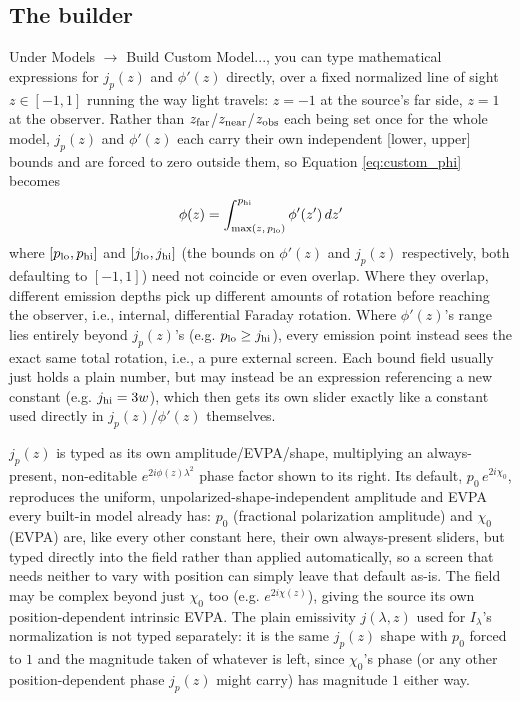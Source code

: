 \subsection{The builder}
Under Models $\to$ Build Custom Model..., you can type mathematical expressions for $j_p(z)$ and $\phi'(z)$ directly, over a fixed normalized line of sight $z\in[-1,1]$ running the way light travels: $z=-1$ at the source's far side, $z=1$ at the observer. Rather than $z_{\rm far}$/$z_{\rm near}$/$z_{\rm obs}$ each being set once for the whole model, $j_p(z)$ and $\phi'(z)$ each carry their own independent [lower, upper] bounds and are forced to zero outside them, so Equation \ref{eq:custom_phi} becomes
\begin{equation}\label{eq:custom_phi_impl}
    \displaystyle \phi(z) = \int_{\max(z,\,p_{\rm lo})}^{p_{\rm hi}} \phi'(z')\,dz'
\end{equation}
where $[p_{\rm lo},p_{\rm hi}]$ and $[j_{\rm lo},j_{\rm hi}]$ (the bounds on $\phi'(z)$ and $j_p(z)$ respectively, both defaulting to $[-1,1]$) need not coincide or even overlap. Where they overlap, different emission depths pick up different amounts of rotation before reaching the observer, i.e., internal, differential Faraday rotation. Where $\phi'(z)$'s range lies entirely beyond $j_p(z)$'s (e.g. $p_{\rm lo}\geq j_{\rm hi}$), every emission point instead sees the exact same total rotation, i.e., a pure external screen. Each bound field usually just holds a plain number, but may instead be an expression referencing a new constant (e.g. $j_{\rm hi}=3w$), which then gets its own slider exactly like a constant used directly in $j_p(z)$/$\phi'(z)$ themselves.

$j_p(z)$ is typed as its own amplitude/EVPA/shape, multiplying an always-present, non-editable $e^{2i\phi(z)\lambda^2}$ phase factor shown to its right. Its default, $p_0\,e^{2i\chi_0}$, reproduces the uniform, unpolarized-shape-independent amplitude and EVPA every built-in model already has: $p_0$ (fractional polarization amplitude) and $\chi_0$ (EVPA) are, like every other constant here, their own always-present sliders, but typed directly into the field rather than applied automatically, so a screen that needs neither to vary with position can simply leave that default as-is. The field may be complex beyond just $\chi_0$ too (e.g. $e^{2i\chi(z)}$), giving the source its own position-dependent intrinsic EVPA. The plain emissivity $j(\lambda,z)$ used for $I_\lambda$'s normalization is not typed separately: it is the same $j_p(z)$ shape with $p_0$ forced to $1$ and the magnitude taken of whatever is left, since $\chi_0$'s phase (or any other position-dependent phase $j_p(z)$ might carry) has magnitude $1$ either way.

